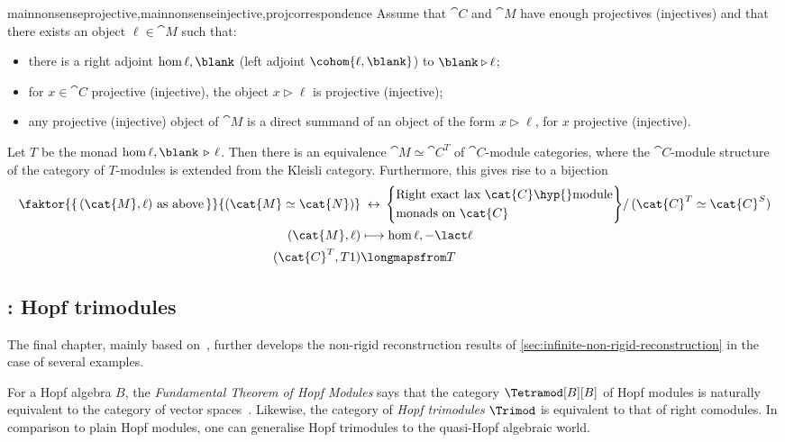 \begin{reptheorem}{mainnonsenseprojective,mainnonsenseinjective,projcorrespondence}
  Assume that \(\cat{C}\) and \(\cat{M}\) have enough projectives (injectives)
  and that there exists an object \(\ell \in \cat{M}\) such that:
  \begin{itemize}[noitemsep]
    \item there is a right adjoint \(\hom{\ell,\blank}\) (left adjoint \(\cohom{\ell,\blank}\)) to \(\blank \triangleright \ell\);
    \item for \(x \in \cat{C}\) projective (injective), the object \(x \triangleright \ell\) is projective (injective);
    \item any projective (injective) object of \(\cat{M}\) is a direct summand of an object of the form \(x \triangleright \ell\), for \(x\) projective (injective).
  \end{itemize}
  Let \(T\) be the monad \(\hom{\ell, \blank\,\triangleright\,\ell}\).
  Then there is an equivalence \(\cat{M} \simeq \cat{C}^T\) of \(\cat{C}\)\hyp{}module categories,
  where the \(\cat{C}\)\hyp{}module structure of the category of \(T\)\hyp{}modules is extended from the Kleisli category.
  Furthermore, this gives rise to a bijection
  \begin{align*}
    \faktor{\{\,(\cat{M},\ell) \text{ as above}\,\}}{(\cat{M} \simeq \cat{N})}
    &\;\leftrightarrow\,
      \Bigg\{
      \begin{aligned}
        &\text{Right exact lax \(\cat{C}\)\hyp{}module}\\
        &\text{monads on \(\cat{C}\)}
      \end{aligned}
      \Bigg\}
      /\, (\cat{C}^T \simeq \cat{C}^S) \\
    (\cat{M},\ell) &\longmapsto \hom{\ell,-\lact \ell} \\
    (\cat{C}^T, T1) &\longmapsfrom T
  \end{align*}
\end{reptheorem}

\subsection*{: Hopf trimodules}

The final chapter,
mainly based on~\cite{stroinski2024:reconstr},
further develops the non-rigid reconstruction results of \cref{sec:infinite-non-rigid-reconstruction}
in the case of several examples.

For a Hopf algebra \(B\),
the \emph{Fundamental Theorem of Hopf Modules}
says that the category \(\Tetramod[B][B]\) of Hopf modules is
naturally equivalent to
the category of vector spaces~\cite{larson69:hopf}.
Likewise, the category of \emph{Hopf trimodules} \(\Trimod\) is equivalent to that of right comodules.
In comparison to plain Hopf modules, one can generalise Hopf trimodules to the quasi-Hopf algebraic world.

